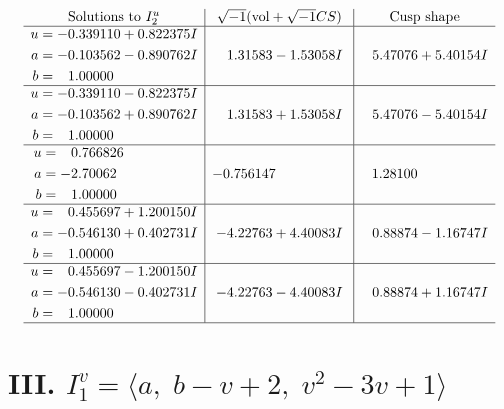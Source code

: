 \documentclass[1p]{elsarticle_modified}
\theoremstyle{definition}
\newcommand{\I}{\sqrt{-1}}
\begin{document}
$$\begin{array}{c|c|c}  
\text{Solutions to }I^u_{2}& \I (\text{vol} + \sqrt{-1}CS) & \text{Cusp shape}\\
 \hline 
\begin{aligned}
u &= -0.339110 + 0.822375 I \\
a &= -0.103562 - 0.890762 I \\
b &= \phantom{-}1.00000\phantom{ +0.000000I}\end{aligned}
 & \phantom{-}1.31583 - 1.53058 I & \phantom{-}5.47076 + 5.40154 I \\ \hline\begin{aligned}
u &= -0.339110 - 0.822375 I \\
a &= -0.103562 + 0.890762 I \\
b &= \phantom{-}1.00000\phantom{ +0.000000I}\end{aligned}
 & \phantom{-}1.31583 + 1.53058 I & \phantom{-}5.47076 - 5.40154 I \\ \hline\begin{aligned}
u &= \phantom{-}0.766826\phantom{ +0.000000I} \\
a &= -2.70062\phantom{ +0.000000I} \\
b &= \phantom{-}1.00000\phantom{ +0.000000I}\end{aligned}
 & -0.756147\phantom{ +0.000000I} & \phantom{-}1.28100\phantom{ +0.000000I} \\ \hline\begin{aligned}
u &= \phantom{-}0.455697 + 1.200150 I \\
a &= -0.546130 + 0.402731 I \\
b &= \phantom{-}1.00000\phantom{ +0.000000I}\end{aligned}
 & -4.22763 + 4.40083 I & \phantom{-}0.88874 - 1.16747 I \\ \hline\begin{aligned}
u &= \phantom{-}0.455697 - 1.200150 I \\
a &= -0.546130 - 0.402731 I \\
b &= \phantom{-}1.00000\phantom{ +0.000000I}\end{aligned}
 & -4.22763 - 4.40083 I & \phantom{-}0.88874 + 1.16747 I\\
 \hline 
 \end{array}$$\newpage\newpage\renewcommand{\arraystretch}{1}
\centering \section*{III. $I^v_{1}= \langle a,\;b- v+2,\;v^2-3 v+1 \rangle$}
\end{document}
